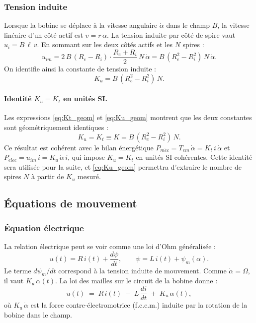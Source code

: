 \subsubsection{Tension induite}

Lorsque la bobine se déplace à la vitesse angulaire \(\dot\alpha\) dans le champ \(B\), la vitesse linéaire d'un côté actif est \(v = r\,\dot\alpha\). La tension induite par côté de spire vaut \(u_i = B\,\ell\,v\). En sommant sur les deux côtés actifs et les \(N\) spires :
\begin{equation}
u_{im} = 2\,B\,(R_e - R_i)\cdot\frac{R_e + R_i}{2}\,N\,\dot\alpha = B\,(R_e^2 - R_i^2)\,N\,\dot\alpha.
\end{equation}
On identifie ainsi la constante de tension induite :
\begin{equation}
K_u = B\,(R_e^2 - R_i^2)\,N.
\label{eq:Ku_geom}
\end{equation}

\paragraph{Identité \(K_u = K_t\) en unités SI.}
Les expressions \eqref{eq:Kt_geom} et \eqref{eq:Ku_geom} montrent que les deux constantes sont géométriquement identiques :
\begin{equation}
\boxed{\,K_u = K_t \equiv K = B\,(R_e^2 - R_i^2)\,N.\,}
\label{eq:Ku_eq_Kt}
\end{equation}
Ce résultat est cohérent avec le bilan énergétique \(P_{m\acute{e}c} = T_{em}\,\dot\alpha = K_t\,i\,\dot\alpha\) et \(P_{\acute{e}lec} = u_{im}\,i = K_u\,\dot\alpha\,i\), qui impose \(K_u = K_t\) en unités SI cohérentes. Cette identité sera utilisée pour la suite, et \eqref{eq:Ku_geom} permettra d'extraire le nombre de spires \(N\) à partir de \(K_u\) mesuré.

\subsection{Équations de mouvement}

\subsubsection{Équation électrique}

La relation électrique peut se voir comme une loi d'Ohm généralisée :
\[
u(t) = R\,i(t) + \frac{d\psi}{dt}, \qquad \psi = L\,i(t) + \psi_m(\alpha).
\]
Le terme \(d\psi_m/dt\) correspond à la tension induite de mouvement. Comme \(\dot\alpha = \Omega\), il vaut \(K_u\,\dot{\alpha}(t)\).
La loi des mailles sur le circuit de la bobine donne :
\begin{equation}
u(t) \;=\; R\,i(t) \;+\; L\,\frac{di}{dt} \;+\; K_u\,\dot{\alpha}(t),
\label{eq:elec}
\end{equation}
où \(K_u\,\dot{\alpha}\) est la force contre-électromotrice (f.c.e.m.) induite par la rotation de la bobine dans le champ.

